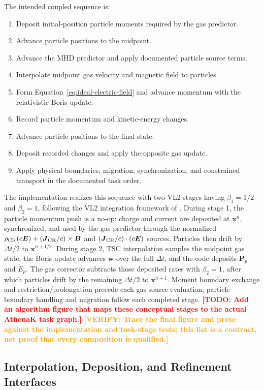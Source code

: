 \documentclass[twocolumn]{aastex701}
\newcommand{\TODO}[1]{\textcolor{red}{\textbf{[TODO: #1]}}}
\newcommand{\VERIFY}[1]{\textcolor{orange}{\textbf{[VERIFY: #1]}}}
\begin{document}
The intended coupled sequence is:
\begin{enumerate}
\item Deposit initial-position particle moments required by the gas predictor.
\item Advance particle positions to the midpoint.
\item Advance the MHD predictor and apply documented particle source terms.
\item Interpolate midpoint gas velocity and magnetic field to particles.
\item Form Equation~\ref{eq:ideal-electric-field} and advance momentum with the
relativistic Boris update.
\item Record particle momentum and kinetic-energy changes.
\item Advance particle positions to the final state.
\item Deposit recorded changes and apply the opposite gas update.
\item Apply physical boundaries, migration, synchronization, and constrained
transport in the documented task order.
\end{enumerate}
The implementation realizes this sequence with two VL2 stages having
$\beta_1=1/2$ and $\beta_2=1$, following the VL2 integration framework of
\citet{StoneGardiner2009}. During stage 1, the particle momentum push is a
no-op: charge and current are deposited at $\boldsymbol{x}^n$, synchronized,
and used by the gas predictor through the normalized
$\rho_{\rm CR}(c\boldsymbol{E})+(\boldsymbol{J}_{\rm CR}/c)\times\boldsymbol{B}$
and $(\boldsymbol{J}_{\rm CR}/c)\cdot(c\boldsymbol{E})$ sources. Particles then
drift by $\Delta t/2$ to $\boldsymbol{x}^{n+1/2}$. During stage 2, TSC
interpolation samples the midpoint gas state, the Boris update advances
$\boldsymbol{w}$ over the full $\Delta t$, and the code deposits
$\dot{\boldsymbol{P}}_p$ and $\dot{E}_p$. The gas corrector subtracts those
deposited rates with $\beta_2=1$, after which particles drift by the remaining
$\Delta t/2$ to $\boldsymbol{x}^{n+1}$. Moment boundary exchange and
restriction/prolongation precede each gas source evaluation; particle boundary
handling and migration follow each completed stage.
\TODO{Add an algorithm figure that maps these conceptual stages to the actual
AthenaK task graph.}
\VERIFY{Trace the final figure and prose against the implementation and
task-stage tests; this list is a contract, not proof that every composition is
qualified.}

\subsection{Interpolation, Deposition, and Refinement Interfaces}
\end{document}
